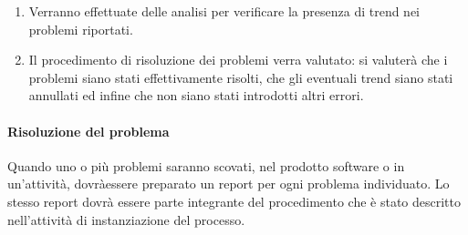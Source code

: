 \begin{enumerate}
				\item Verranno effettuate delle analisi per verificare la presenza di trend nei problemi riportati.

				\item Il procedimento di risoluzione dei problemi verra valutato: si valuterà che i problemi siano stati effettivamente risolti, che gli eventuali trend siano stati annullati ed infine che non siano stati introdotti altri errori.
			\end{enumerate}	
		\paragraph{Risoluzione del problema}
			Quando uno o più problemi saranno scovati, nel prodotto software o in un'attività, dovràessere preparato un report per ogni problema individuato. Lo stesso report dovrà essere parte integrante del procedimento che è stato descritto nell'attività di instanziazione del processo.

